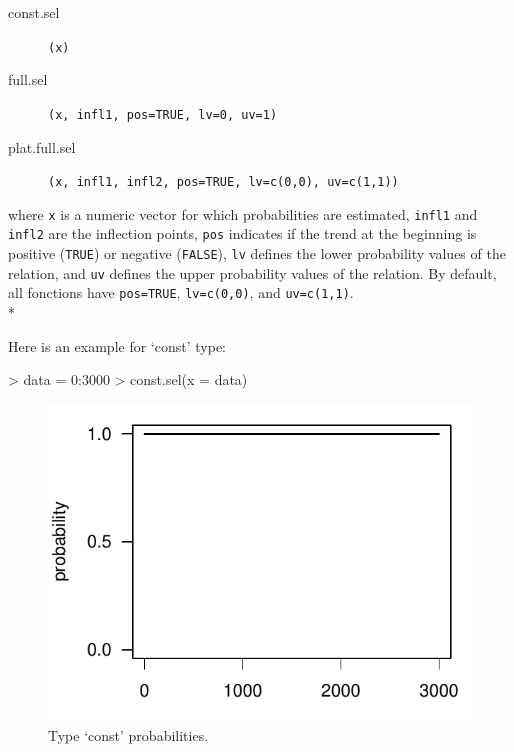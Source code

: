 \documentclass[letterpaper, 12pt]{article}
\begin{document}
\begin{description}
\item[const.sel]\verb#(x)#
\item[full.sel]\verb#(x, infl1, pos=TRUE, lv=0, uv=1)#
\item[plat.full.sel]\verb#(x, infl1, infl2, pos=TRUE, lv=c(0,0), uv=c(1,1))#
\end{description}
where \verb#x# is a numeric vector for which probabilities are estimated, \verb#infl1# and \verb#infl2# are the inflection points, 
\verb#pos# indicates if the trend at the beginning is positive  (\verb#TRUE#) or negative (\verb#FALSE#), \verb#lv# defines the 
lower probability values of the relation, and \verb#uv# defines the upper probability values of the relation. By default, 
all fonctions have \verb#pos=TRUE#, \verb#lv=c(0,0)#, and \verb#uv=c(1,1)#.\\*

Here is an example for `const' type:


\begin{Schunk}
\begin{Sinput}
> data = 0:3000
> const.sel(x = data)
\end{Sinput}
\end{Schunk}

\begin{figure}[h]
\vspace{-20pt}
\begin{center}
\includegraphics{relation_sel-003}
\end{center}
  \vspace{-30pt}
  \caption{Type `const' probabilities.}
  \vspace{-10pt}
\label{fig1}
\end{figure}
\vspace*{\fill}
\end{document}
